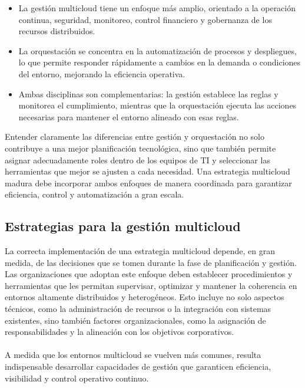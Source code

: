 {                \begin{itemize}
                    \item La gestión multicloud tiene un enfoque más amplio, orientado a la operación continua, seguridad, monitoreo, control financiero y gobernanza de los recursos distribuidos.
                    \item La orquestación se concentra en la automatización de procesos y despliegues, lo que permite responder rápidamente a cambios en la demanda o condiciones del entorno, mejorando la eficiencia operativa.
                    \item Ambas disciplinas son complementarias: la gestión establece las reglas y monitorea el cumplimiento, mientras que la orquestación ejecuta las acciones necesarias para mantener el entorno alineado con esas reglas.
                \end{itemize}

                Entender claramente las diferencias entre gestión y orquestación no solo contribuye a una mejor planificación tecnológica, sino que también permite asignar adecuadamente roles dentro de los equipos de TI y seleccionar las herramientas que mejor se ajusten a cada necesidad. Una estrategia multicloud madura debe incorporar ambos enfoques de manera coordinada para garantizar eficiencia, control y automatización a gran escala.

        \subsection{Estrategias para la gestión multicloud}
            La correcta implementación de una estrategia multicloud depende, en gran medida, de las decisiones que se tomen durante la fase de planificación y gestión. Las organizaciones que adoptan este enfoque deben establecer procedimientos y herramientas que les permitan supervisar, optimizar y mantener la coherencia en entornos altamente distribuidos y heterogéneos. Esto incluye no solo aspectos técnicos, como la administración de recursos o la integración con sistemas existentes, sino también factores organizacionales, como la asignación de responsabilidades y la alineación con los objetivos corporativos.
            
            \paragraph{}A medida que los entornos multicloud se vuelven más comunes, resulta indispensable desarrollar capacidades de gestión que garanticen eficiencia, visibilidad y control operativo continuo.

}
